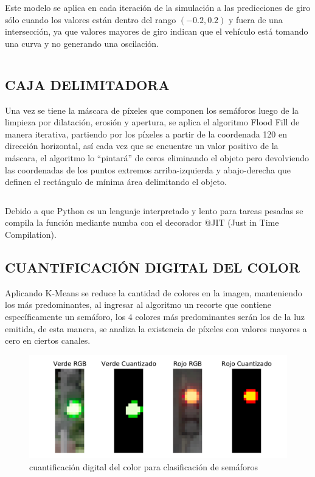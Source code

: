 		Este modelo se aplica en cada iteración de la simulación a las predicciones de giro sólo cuando los valores están dentro del rango $(-0.2, 0.2)$ y fuera de una intersección, ya que valores mayores de giro indican que el vehículo está tomando una curva y no generando una oscilación.
		
		\inputminted[frame=lines,
		baselinestretch=1,
		fontsize=\footnotesize,
		autogobble]{python}{codigos/marco-aplicativo/ema.py}
		
	\subsection{CAJA DELIMITADORA}
		Una vez se tiene la máscara de píxeles que componen los semáforos luego de la limpieza por dilatación, erosión y apertura, se aplica el algoritmo Flood Fill de manera iterativa, partiendo por los píxeles a partir de la coordenada 120 en dirección horizontal, así cada vez que se encuentre un valor positivo de la máscara, el algoritmo lo ``pintará'' de ceros eliminando el objeto pero devolviendo las coordenadas de los puntos extremos arriba-izquierda y abajo-derecha que definen el rectángulo de mínima área delimitando el objeto.
		
		\inputminted[frame=lines,
		baselinestretch=1,
		fontsize=\footnotesize,
		autogobble]{python}{codigos/marco-aplicativo/flood_fill.py}
		
		Debido a que Python es un lenguaje interpretado y lento para tareas pesadas se compila la función mediante numba con el decorador @JIT (Just in Time Compilation).
		
	\subsection{CUANTIFICACIÓN DIGITAL DEL COLOR}
		Aplicando K-Means se reduce la cantidad de colores en la imagen, manteniendo los más predominantes, al ingresar al algoritmo un recorte que contiene específicamente un semáforo, los 4 colores más predominantes serán los de la luz emitida, de esta manera, se analiza la existencia de píxeles con valores mayores a cero en ciertos canales.
		
		\begin{figure}[H]
			\centering
			\includegraphics[scale=0.65]{imagenes/sign}
			\caption[Cuantificación digital del color]{cuantificación digital del color para clasificación de semáforos}
			\label{semaforo}
		\end{figure}
		
